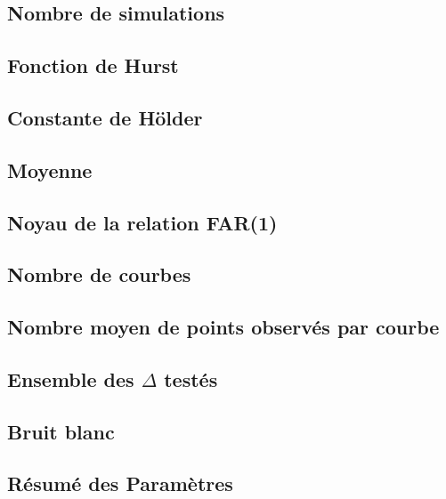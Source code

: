 
\subsection{Nombre de simulations}
\label{subsec:nb-simulations}


\subsection{Fonction de Hurst}
\label{sec:sim_fcn_hurst}


\subsection{Constante de Hölder}
\label{subsec:constante-holder}


\subsection{Moyenne}
\label{subsec:moyenne}


\subsection{Noyau de la relation FAR(1)}
\label{subsec:noyau-far}


\subsection{Nombre de courbes}
\label{subsec:nb-courbes}


\subsection{Nombre moyen de points observés par courbe}
\label{subsec:nb-moy-pts-obs-par-courbe}


\subsection{Ensemble des $\Delta$ testés}
\label{subsec:delta-test}


\subsection{Bruit blanc}
\label{subsec:bruit-blanc}


\subsection{Résumé des Paramètres}
\label{subsec:resume-params-simul}
